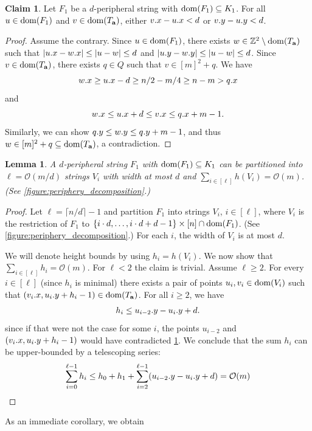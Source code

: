 \documentclass[11pt, letterpaper]{article}
\theoremstyle{plain}
\newtheorem{lemma}{Lemma}
\theoremstyle{definition}
\newtheorem{claim}{Claim}
\theoremstyle{remark}
\newcommand{\Z}{\mathbb{Z}}
\renewcommand{\O}{\mathcal{O}}
\newcommand{\set}[1]{\left\lbrace #1 \right\rbrace}
\newcommand{\absolute}[1]{\left\lvert#1\right\rvert}
\begin{document}
\begin{claim}\label{border_lemma}
Let $F_1$ be a $d$-peripheral string with $\operatorname*{dom}(F_1) \subseteq K_1$. For all $u \in \operatorname*{dom}(F_1)$ and ${v \in \operatorname*{dom}(T_\mathbf{a})}$, either $v.x - u.x < d$ or $v.y - u.y < d$.  
\end{claim}
\begin{proof}
Assume the contrary. Since $u \in \operatorname*{dom}(F_1)$, there exists $w \in \Z^2 \setminus \d{\Ta}$ such that $\absolute{\x{u} - \x{w}} \le \absolute{u-w} \le d$ and $\absolute{\y{u} - \y{w}} \le \absolute{u-w} \le d$. Since $v \in \operatorname*{dom}(T_\mathbf{a})$, there exists $q \in Q$ such that $v \in [m]^2 + q$. We have
\[ w.x \ge u.x - d \ge n/2 - m/4 \ge n - m > q.x\]
and
\[ w.x \le u.x + d \le v.x \le q.x + m - 1. \]
Similarly, we can show $q.y \le w.y \le q.y + m - 1$, and thus $w \in [m]^2 + q \subseteq \operatorname*{dom}(T_\mathbf{a})$, a contradiction.
\end{proof}

\begin{lemma}\label{lm:partitioning}
A $d$-peripheral string $F_1$ with $\operatorname*{dom}(F_1) \subseteq K_1$ can be partitioned into $\ell = \O(m/d)$ strings $V_i$ with width at most $d$ and $\sum_{i \in [\ell]} h(V_i) = \O(m)$. (See \cref{figure:periphery_decomposition}.)
\end{lemma}
\begin{proof}
Let $\ell = \lceil n / d \rceil - 1$ and partition $F_1$ into strings $V_i$, $i \in [\ell]$, where $V_i$ is the restriction of $F_1$ to $\set{i \cdot d, \dots, i \cdot d + d - 1} \times [n] \cap \d{F_1}$. (See \cref{figure:periphery_decomposition}.) 
For each $i$, the width of $V_i$ is at most $d$. 

We will denote height bounds by using $h_i = h(V_i)$. We now show that $\sum_{i \in [\ell]} h_i = \O(m)$. For $\ell < 2$ the claim is trivial. Assume $\ell \ge 2$. For every $i \in [\ell]$ (since $h_i$ is minimal) there exists a pair of points $u_i, v_i \in \operatorname*{dom}(V_i)$ such that $(v_i.x, u_i.y + h_i - 1) \in \operatorname*{dom}(T_\mathbf{a})$. For all $i \ge 2$, we have
\[ h_i \le u_{i - 2}.y - u_{i}.y + d.\]
since if that were not the case for some $i$, the points $u_{i - 2}$ and $(v_{i}.x, u_{i}.y + h_i - 1)$ would have contradicted \cref{border_lemma}. We conclude that the sum $h_i$ can be upper-bounded by a telescoping series:
%
$$\sum_{i = 0}^{\ell - 1} h_i \le h_0 + h_1 + \sum_{i = 2}^{\ell - 1} (\y{u_{i - 2}} - \y{u_i} + d) = \O(m)\qedhere$$
\end{proof}

As an immediate corollary, we obtain
\end{document}
